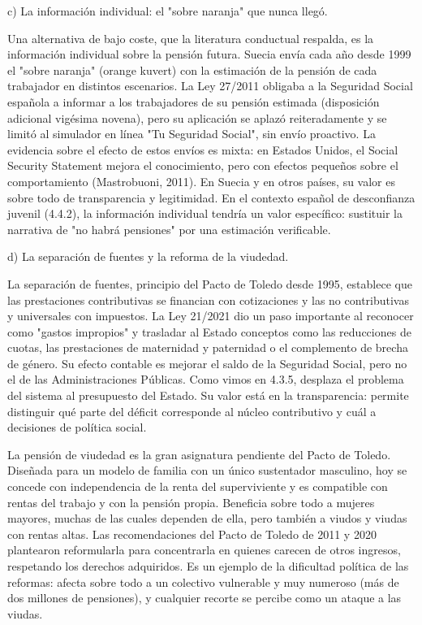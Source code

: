 \documentclass[10pt,a4paper]{article}
\begin{document}
c) La información individual: el "sobre naranja" que nunca llegó.

Una alternativa de bajo coste, que la literatura conductual respalda, es la información individual sobre la pensión futura. Suecia envía cada año desde 1999 el "sobre naranja" (orange kuvert) con la estimación de la pensión de cada trabajador en distintos escenarios. La Ley 27/2011 obligaba a la Seguridad Social española a informar a los trabajadores de su pensión estimada (disposición adicional vigésima novena), pero su aplicación se aplazó reiteradamente y se limitó al simulador en línea "Tu Seguridad Social", sin envío proactivo. La evidencia sobre el efecto de estos envíos es mixta: en Estados Unidos, el Social Security Statement mejora el conocimiento, pero con efectos pequeños sobre el comportamiento (Mastrobuoni, 2011). En Suecia y en otros países, su valor es sobre todo de transparencia y legitimidad. En el contexto español de desconfianza juvenil (4.4.2), la información individual tendría un valor específico: sustituir la narrativa de "no habrá pensiones" por una estimación verificable.

d) La separación de fuentes y la reforma de la viudedad.

La separación de fuentes, principio del Pacto de Toledo desde 1995, establece que las prestaciones contributivas se financian con cotizaciones y las no contributivas y universales con impuestos. La Ley 21/2021 dio un paso importante al reconocer como "gastos impropios" y trasladar al Estado conceptos como las reducciones de cuotas, las prestaciones de maternidad y paternidad o el complemento de brecha de género. Su efecto contable es mejorar el saldo de la Seguridad Social, pero no el de las Administraciones Públicas. Como vimos en 4.3.5, desplaza el problema del sistema al presupuesto del Estado. Su valor está en la transparencia: permite distinguir qué parte del déficit corresponde al núcleo contributivo y cuál a decisiones de política social.

La pensión de viudedad es la gran asignatura pendiente del Pacto de Toledo. Diseñada para un modelo de familia con un único sustentador masculino, hoy se concede con independencia de la renta del superviviente y es compatible con rentas del trabajo y con la pensión propia. Beneficia sobre todo a mujeres mayores, muchas de las cuales dependen de ella, pero también a viudos y viudas con rentas altas. Las recomendaciones del Pacto de Toledo de 2011 y 2020 plantearon reformularla para concentrarla en quienes carecen de otros ingresos, respetando los derechos adquiridos. Es un ejemplo de la dificultad política de las reformas: afecta sobre todo a un colectivo vulnerable y muy numeroso (más de dos millones de pensiones), y cualquier recorte se percibe como un ataque a las viudas.
\end{document}
